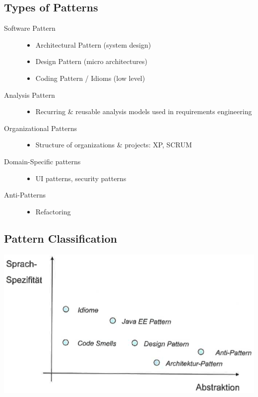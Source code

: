 \documentclass[a4paper, 11pt]{article}
\begin{document}
\subsection{Types of Patterns}
\begin{description}
	\item[Software Pattern] \hfill
		\begin{itemize}
			\item Architectural Pattern (system design)
			\item Design Pattern (micro architectures)
			\item Coding Pattern / Idioms (low level)
		\end{itemize}
	\item[Analysis Pattern] \hfill
		\begin{itemize}
			\item Recurring \& reusable analysis models used in requirements engineering
		\end{itemize}
	\item[Organizational Patterns] \hfill
		\begin{itemize}
			\item Structure of organizations \& projects: XP, SCRUM
		\end{itemize}
	\item[Domain-Specific patterns] \hfill
		\begin{itemize}
			\item UI patterns, security patterns
		\end{itemize}
	\item[Anti-Patterns] \hfill
		\begin{itemize}
			\item Refactoring
		\end{itemize}
\end{description}

\subsection{Pattern Classification}

\includegraphics[scale=0.5]{pattern-classification.png}
\end{document}

